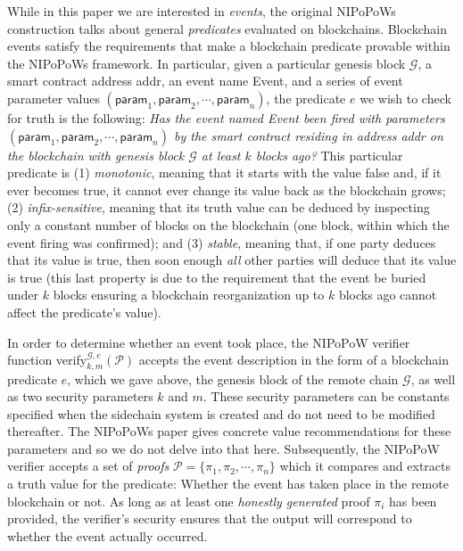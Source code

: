 While in this paper we are interested in \emph{events}, the original NIPoPoWs
construction talks about general \emph{predicates} evaluated on blockchains.
Blockchain events satisfy the requirements that make a blockchain predicate
provable within the NIPoPoWs framework. In particular, given a particular
genesis block $\mathcal{G}$, a smart contract address \textsf{addr}, an event
name \textsf{Event}, and a series of event parameter values $(\textsf{param}_1,
\textsf{param}_2, \cdots, \textsf{param}_n)$, the predicate $e$ we wish to check
for truth is the following: \emph{Has the event named \textsf{Event} been fired
with parameters $(\textsf{param}_1, \textsf{param}_2, \cdots, \textsf{param}_n)$
by the smart contract residing in address \textsf{addr} on the blockchain with
genesis block $\mathcal{G}$ at least $k$ blocks ago?} This particular predicate
is (1) \emph{monotonic}, meaning that it starts with the value \textsf{false}
and, if it ever becomes \textsf{true}, it cannot ever change its value back as
the blockchain grows; (2) \emph{infix-sensitive}, meaning that its truth value
can be deduced by inspecting only a constant number of blocks on the blockchain
(one block, within which the event firing was confirmed); and (3) \emph{stable},
meaning that, if one party deduces that its value is \textsf{true}, then soon
enough \emph{all} other parties will deduce that its value is \textsf{true}
(this last property is due to the requirement that the event be buried under $k$
blocks ensuring a blockchain reorganization up to $k$ blocks ago cannot affect
the predicate's value).

In order to determine whether an event took place, the NIPoPoW verifier function
\textsf{verify}$^{\mathcal{G},e}_{k,m}(\mathcal{P})$ accepts the event
description in the form of a blockchain predicate $e$, which we gave above, the
genesis block of the remote chain $\mathcal{G}$, as well as two security
parameters $k$ and $m$. These security parameters can be constants specified
when the sidechain system is created and do not need to be modified thereafter.
The NIPoPoWs paper gives concrete value recommendations for these parameters and
so we do not delve into that here. Subsequently, the NIPoPoW verifier accepts a
set of \emph{proofs} $\mathcal{P} = \{\pi_1, \pi_2, \cdots, \pi_n\}$ which it
compares and extracts a truth value for the predicate: Whether the event has
taken place in the remote blockchain or not. As long as at least one
\emph{honestly generated} proof $\pi_i$ has been provided, the verifier's
security ensures that the output will correspond to whether the event actually
occurred.

